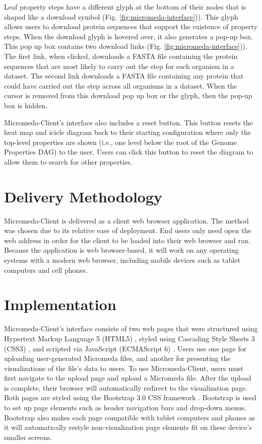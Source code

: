 Leaf property steps have a different glyph at the bottom of their nodes that is shaped like a download symbol (Fig. \ref{fig:micromeda-interface})). This glyph allows users to download protein sequences that support the existence of property steps. When the download glyph is hovered over, it also generates a pop-up box. This pop up box contains two download links (Fig. \ref{fig:micromeda-interface})). The first link, when clicked, downloads a FASTA file containing the protein sequences that are most likely to carry out the step for each organism in a dataset. The second link downloads a FASTA file containing any protein that could have carried out the step across all organisms in a dataset. When the cursor is removed from this download pop up box or the glyph, then the pop-up box is hidden.

Micromeda-Client's interface also includes a reset button. This button resets the heat map and icicle diagram back to their starting configuration where only the top-level properties are shown (i.e., one level below the root of the Genome Properties DAG) to the user. Users can click this button to reset the diagram to allow them to search for other properties.

\section{Delivery Methodology}

Micromeda-Client is delivered as a client web browser application. The method was chosen due to its relative ease of deployment. End users only need open the web address in order for the client to be loaded into their web browser and ran. Because the application is web browser-based, it will work on any operating systems with a modern web browser, including mobile devices such as tablet computers and cell phones.

\section{Implementation}

Micromeda-Client's interface consists of two web pages that were structured using Hypertext Markup Language 5 (HTML5) \cite{HTML5}, styled using Cascading Style Sheets 3 (CSS3) \cite{CSS3}, and scripted via JavaScript (ECMAScript 6) \cite{flanagan2006javascript}. Users use one page for uploading user-generated Micromeda files, and another for presenting the visualizations of the file's data to users. To use Micromeda-Client, users must first navigate to the upload page and upload a Micromeda file. After the upload is complete, their browser will automatically redirect to the visualization page. Both pages are styled using the Bootstrap 3.0 CSS framework \cite{spurlock2013bootstrap}. Bootstrap is used to set up page elements such as header navigation bars and drop-down menus. Bootstrap also makes each page compatible with tablet computers and phones as it will automatically restyle non-visualization page elements fit on these device's smaller screens.


